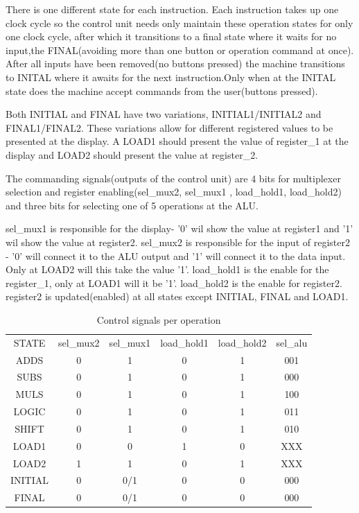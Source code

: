 \documentclass[12pt]{article}
\begin{document}
There is one different state for each instruction. Each instruction takes up one clock cycle so the control unit needs only maintain these operation states for only one clock cycle, after which it transitions to a final state where it waits for no input,the FINAL(avoiding more than one button or operation command at once). After all inputs have been removed(no buttons pressed) the machine transitions to INITAL where it awaits for the next instruction.Only when at the INITAL state does the machine accept commands from the user(buttons pressed).

Both INITIAL and FINAL have two variations, INITIAL1/INITIAL2 and FINAL1/FINAL2. These variations allow for different registered values to be presented at the display. A LOAD1 should present the value of register\_1 at the display and LOAD2 should present the value at register\_2.

The commanding signals(outputs of the control unit) are 4 bits for multiplexer selection and register enabling(sel\_mux2, sel\_mux1 , load\_hold1, load\_hold2) and three bits for selecting one of 5 operations at the ALU.

sel\_mux1 is responsible for the display- '0' wil show the value at register1 and '1' wil show the value at register2.
sel\_mux2 is responsible for the input of register2 - '0' will connect it to the ALU output and '1' will connect it to the data input. Only at LOAD2 will this take the value '1'. load\_hold1 is the enable for the register\_1, only at LOAD1 will it be '1'. load\_hold2 is the enable for register2. register2 is updated(enabled) at all states except INITIAL, FINAL and LOAD1.


\begin{table}[H]
	\centering
	\begin{tabular}{cccccc}
		STATE & sel\_mux2 & sel\_mux1 & load\_hold1 & load\_hold2 & sel\_alu\\
		ADDS    & 0 & 1 & 0 & 1 & 001\\
		SUBS    & 0 & 1 & 0 & 1 & 000\\
		MULS    & 0 & 1 & 0 & 1 & 100\\
		LOGIC   & 0 & 1 & 0 & 1 & 011\\
		SHIFT   & 0 & 1 & 0 & 1 & 010\\
		LOAD1   & 0 & 0 & 1 & 0 & XXX\\
		LOAD2   & 1 & 1 & 0 & 1 & XXX\\
		INITIAL & 0 & 0/1 & 0 & 0 & 000\\
		FINAL   & 0 & 0/1 & 0 & 0 & 000\\
	\end{tabular}
	\caption{Control signals per operation}
	\label{tab:my_label}
\end{table}
\end{document}
